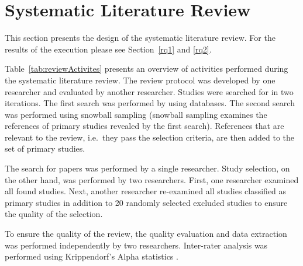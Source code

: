 
\section{\label{slr}Systematic Literature Review}

This section presents the design of the systematic literature review. For the results of the execution please see Section~\ref{rq1} and \ref{rq2}.

Table~\ref{tab:reviewActivites} presents an overview of activities performed during the systematic literature review. The review protocol was developed by one researcher and evaluated by another researcher. Studies were searched for in two iterations. The first search was performed by using databases. The second search was performed using snowball sampling \citep{Goodman1961} (snowball sampling examines the references of primary studies revealed by the first search). References that are relevant to the review, i.e.\ they pass the selection criteria, are then added to the set of primary studies.

The search for papers was performed by a single researcher. Study selection, on the other hand, was performed by two researchers. First, one researcher examined all found studies. Next, another researcher re-examined all studies classified as primary studies in addition to 20 randomly selected excluded studies to ensure the quality of the selection.

To ensure the quality of the review, the quality evaluation and data extraction was performed independently by two researchers. Inter-rater analysis was performed using Krippendorf's Alpha statistics \citep{Krippendorff1970,Krippendorff2004a}.


